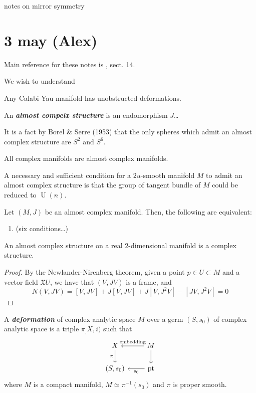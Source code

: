 \documentclass{article}
\numberwithin{equation}{section}
\newcommand{\Xf}{\mathfrak{X}}
\DeclareMathOperator{\pt}{pt}
\DeclareMathOperator{\U}{U}
\begin{document}
{\LARGE notes on mirror symmetry}
\section{3 may (Alex)}
Main reference for these notes is \cite{gross}, sect. 14.

We wish to understand
\begin{thm}
	Any Calabi-Yau manifold has unobstructed deformations.
\end{thm}

\begin{defn}
	An \textbf{\textit{almost compelx structure}} is an endomorphism $J$…
 \end{defn}
 \begin{remark}
 	It is a fact by Borel \& Serre (1953) that the only spheres which admit an almost complex structure are $S^2$ and $S^6$.
 \end{remark}
\begin{example}
	All complex manifolds are almost complex manifolds.
\end{example}
\begin{thm}
	A necessary and sufficient condition for a $2u$-smooth manifold $M$ to admit an almost complex structure is that the group of tangent bundle of $M$ could be reduced to $\U(n)$.
\end{thm}
\begin{thm}
	Let $(M,J)$ be an almost complex manifold. Then, the following are equivalent:
	\begin{enumerate}
		\item (six conditions…)
	\end{enumerate}
\end{thm}
\begin{prop}
	An almost complex structure on a real 2-dimensional manifold is a complex structure.
\end{prop}
\begin{proof}
	By the Newlander-Nirenberg theorem, given a point $p\in U\subset M$ and a vector field $\Xf{U}$, we have that $(V,JV)$ is a frame, and
	\[N(V,JV)=[V,JV]+J[V,JV]+J[V,J^2V]-[JV,J^2V]=0\]
\end{proof}
\begin{defn}
	A \textbf{\textit{deformation}} of complex analytic space $M$ over a germ $(S,s_0)$ of complex analytic space is a triple $\pi_,X,i)$ such that
	\[\begin{tikzcd}
		X\arrow[d,"\pi",swap]&M\arrow[l,"\text{embedding}",swap]\arrow[d]\\
		(S,s_0)&\pt\arrow[l,"s_0"]
	\end{tikzcd}\]
	where $M$ is a compact manifold, $M\simeq\pi^{-1}(s_0)$ and $\pi$ is proper smooth.
\end{defn}
\end{document}
